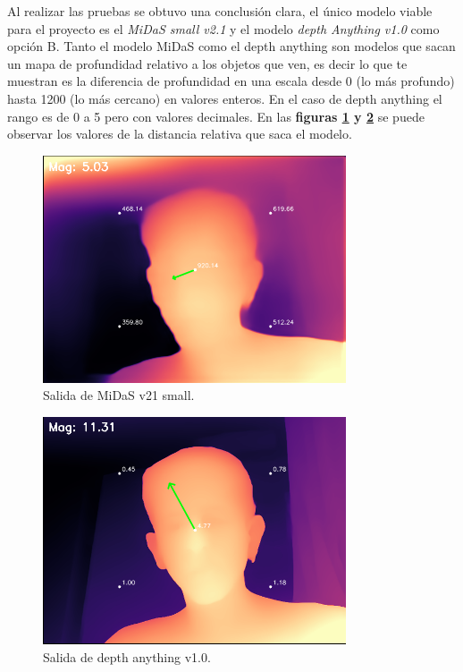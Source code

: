 Al realizar las pruebas se obtuvo una conclusión clara, el único modelo viable para el proyecto es el \textit{MiDaS small v2.1} y el modelo \textit{depth Anything v1.0} como opción B. Tanto el modelo MiDaS como el depth anything son modelos que sacan un mapa de profundidad relativo a los objetos que ven, es decir lo que te muestran es la diferencia de profundidad en una escala desde 0 (lo más profundo) hasta 1200 (lo más cercano) en valores enteros. En el caso de depth anything el rango es de 0 a 5 pero con valores decimales. En las \textbf{figuras \ref{fig:midas_test} y \ref{fig:depth_Any_test}} se puede observar los valores de la distancia relativa que saca el modelo.


\begin{figure}[H]
    \centering
    \includegraphics[width=0.8\textwidth]{images/midas_test.png}
    \caption{Salida de MiDaS v21 small.}
    \label{fig:midas_test}
\end{figure}

\begin{figure}[H]
    \centering
    \includegraphics[width=0.8\textwidth]{images/depth_any_test.png}
    \caption{Salida de depth anything v1.0.}
    \label{fig:depth_Any_test}
\end{figure}

